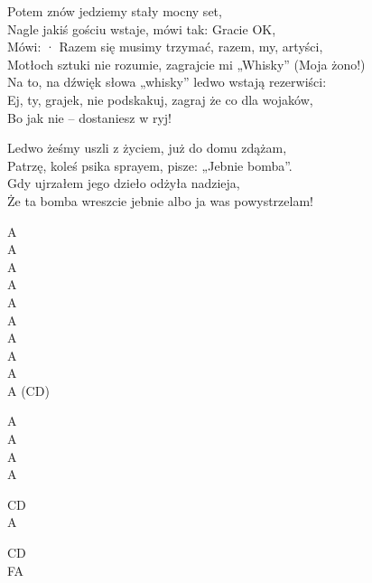 \begin{text}
{Potem znów jedziemy stały mocny set,\\
Nagle jakiś gościu wstaje, mówi tak: Gracie OK,\\
Mówi: · Razem się musimy trzymać, razem, my, artyści,\\
Motłoch sztuki nie rozumie, zagrajcie mi „Whisky” (Moja żono!)\\
Na to, na dźwięk słowa „whisky” ledwo wstają rezerwiści:\\
Ej, ty, grajek, nie podskakuj, zagraj że co dla wojaków,\\
Bo jak nie – dostaniesz w ryj!

Ledwo żeśmy uszli z życiem, już do domu zdążam,\\
Patrzę, koleś psika sprayem, pisze: „Jebnie bomba”.\\
Gdy ujrzałem jego dzieło odżyła nadzieja,\\
Że ta bomba wreszcie jebnie albo ja was powystrzelam!
}
\end{text}
\begin{chord}
    \small{
    A\\
    A\\
    A\\
    A\\
    A\\
    A\\
    A\\
    A\\
    A\\
    A (CD)

    A\\
    A\\
    A\\
    A

    CD\\
    A

    CD\\
    FA
    }
\end{chord}